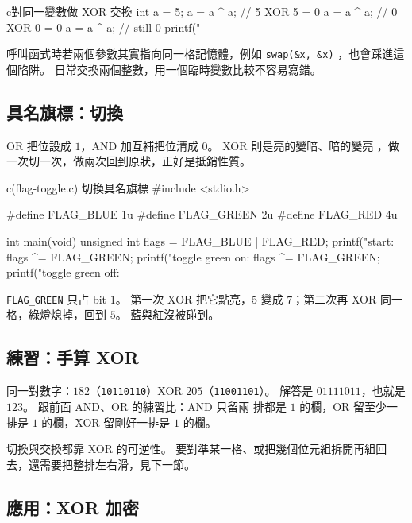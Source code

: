 \begin{code}{c}{對同一變數做 XOR 交換}
int a = 5;
a = a ^ a;   // 5 XOR 5 = 0
a = a ^ a;   // 0 XOR 0 = 0
a = a ^ a;   // still 0
printf("%
\end{code}

呼叫函式時若兩個參數其實指向同一格記憶體，例如 \texttt{swap(\&x, \&x)}
，也會踩進這個陷阱。 日常交換兩個整數，用一個臨時變數比較不容易寫錯。

\subsection{具名旗標：切換}

OR 把位設成 $1$，AND 加互補把位清成 $0$。 XOR 則是亮的變暗、暗的變亮
，做一次切一次，做兩次回到原狀，正好是抵銷性質。

\begin{example}{c}{(flag-toggle.c) 切換具名旗標}
#include <stdio.h>

#define FLAG_BLUE  1u
#define FLAG_GREEN 2u
#define FLAG_RED   4u

int main(void) {
    unsigned int flags = FLAG_BLUE | FLAG_RED;
    printf("start: %
    flags ^= FLAG_GREEN;
    printf("toggle green on: %
    flags ^= FLAG_GREEN;
    printf("toggle green off: %
}
\end{example}


\texttt{FLAG\_GREEN} 只占 bit $1$。 第一次 XOR 把它點亮，$5$ 變成
$7$；第二次再 XOR 同一格，綠燈熄掉，回到 $5$。 藍與紅沒被碰到。

\subsection{練習：手算 XOR}

同一對數字：$182$（\texttt{10110110}）XOR $205$（\texttt{11001101}）。
解答是 $01111011$，也就是 $123$。 跟前面 AND、OR 的練習比：AND 只留兩
排都是 $1$ 的欄，OR 留至少一排是 $1$ 的欄，XOR 留剛好一排是 $1$ 的欄。

切換與交換都靠 XOR 的可逆性。 要對準某一格、或把幾個位元組拆開再組回
去，還需要把整排左右滑，見下一節。

\subsection{應用：XOR 加密}

